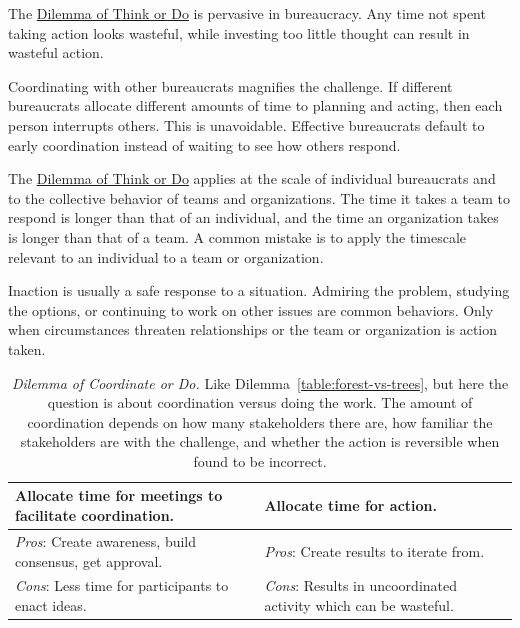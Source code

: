 The \hyperref[table:forest-vs-trees]{Dilemma of Think or Do} is pervasive in bureaucracy. Any time not spent taking action looks wasteful, while investing too little thought can result in wasteful action. 

Coordinating with other bureaucrats magnifies the challenge. If different bureaucrats allocate different amounts of time to planning and acting, then each person interrupts others. This is unavoidable. Effective bureaucrats default to early coordination instead of waiting to see how others respond.

The \hyperref[table:forest-vs-trees]{Dilemma of Think or Do} applies at the scale of individual bureaucrats and to the collective behavior of teams and organizations. The time it takes a team to respond is longer than that of an individual, and the time an organization takes is longer than that of a team.  A common mistake is to apply the timescale relevant to an individual to a team or organization.

Inaction is usually a safe response to a situation. Admiring the problem, studying the options, or continuing to work on other issues are common behaviors. Only when circumstances threaten relationships or the team or organization is action taken.

\begin{center}
\begin{table}[H] %
\begin{tabular}{ | m{\dilemmatablewidth}| m{\dilemmatablewidth} | } 
  \hline
  \textbf{Allocate time for meetings to facilitate coordination.} &
  \textbf{Allocate time for action.} \\
  \hline
  \textit{Pros}: Create awareness, build consensus, get approval. &
  \textit{Pros}: Create results to iterate from. \\
  \hline
  \textit{Cons}: Less time for participants to enact ideas. & 
  \textit{Cons}: Results in uncoordinated activity which can be wasteful. \\
  \hline
\end{tabular}
\caption{\textit{Dilemma of Coordinate or Do.}
Like Dilemma~\ref{table:forest-vs-trees}, but here the question is about coordination versus doing the work. The amount of coordination depends on how many stakeholders there are, how familiar the stakeholders are with the challenge, and whether the action is reversible when found to be incorrect.
}
\label{table:meetings-versus-work}
\end{table}
\end{center}

